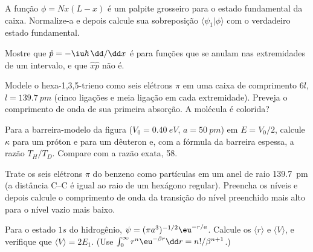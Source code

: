 \begin{exercise}[$\star\star$]\label{exo:b3:quantum-model-systems:7}
A função $\phi = Nx(L - x)$ é um palpite grosseiro para o estado fundamental
da caixa. Normalize-a e depois calcule sua sobreposição $\langle\psi_1|\phi\rangle$
com o verdadeiro estado fundamental.
\end{exercise}

\begin{exercise}[$\star\star$]\label{exo:b3:quantum-model-systems:8}
Mostre que $\hat p = -\iu\hbar\,\dd/\dd x$ é  para funções que se
anulam nas extremidades de um intervalo, e que $\hat x\hat p$ não é.
\end{exercise}

\begin{exercise}[$\star\star$]\label{exo:b3:quantum-model-systems:9}
Modele o hexa-1,3,5-trieno como seis elétrons $\pi$ em uma caixa de comprimento $6l$, $l =
\qty{139.7}{pm}$ (cinco ligações e meia ligação em cada extremidade). Preveja o
comprimento de onda de sua primeira absorção. A molécula é colorida?
\end{exercise}

\begin{exercise}[$\star\star\star$]\label{exo:b3:quantum-model-systems:10}
Para a barreira-modelo da figura ($V_0 = \qty{0.40}{eV}$, $a = \qty{50}{pm}$)
em $E = V_0/2$, calcule $\kappa$ para um próton e para um dêuteron e, com a
fórmula da barreira espessa, a razão $T_H/T_D$. Compare com a razão exata, 58.
\end{exercise}

\begin{exercise}[$\star\star\star$]\label{exo:b3:quantum-model-systems:11}
Trate os seis elétrons $\pi$ do benzeno como partículas em um anel de raio
\qty{139.7}{pm} (a distância C--C é igual ao raio de um hexágono regular).
Preencha os níveis e depois calcule o comprimento de onda da transição do
nível preenchido mais alto para o nível vazio mais baixo.
\end{exercise}

\begin{exercise}[$\star\star\star$]\label{exo:b3:quantum-model-systems:12}
Para o estado $1s$ do hidrogênio, $\psi = (\pi a^3)^{-1/2}\eu^{-r/a}$. Calcule os
 $\langle r\rangle$ e $\langle V\rangle$, e verifique que
$\langle V\rangle = 2E_1$. (Use $\int_0^\infty r^n\eu^{-\beta r}\dd r =
n!/\beta^{n+1}$.)
\end{exercise}

